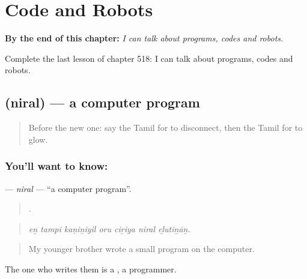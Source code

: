 
\chapter{Code and Robots}
\label{ch:ta-code-and-robots}

\begin{chapteropening}
\textbf{By the end of this chapter:} \emph{I can talk about programs, codes and robots.}

Complete the last lesson of chapter 518: I can talk about programs, codes and robots.
\end{chapteropening}

\section[\texorpdfstring{\ta{நிரல்} (niral)}{நிரல் (niral)}]{ (niral) — a computer program}

\label{lesson:TA-C518-niral}



\begin{quote}
Before the new one: say the Tamil for to disconnect, then the Tamil for to glow.
\end{quote}

\subsection*{You'll want to know: }
\textbf{} — \emph{niral} — \textquotedblleft{}a computer program\textquotedblright{}.

\begin{quote}
      .
\end{quote}

\begin{quote}
\emph{eṉ tampi kaṇiṉiyil oru ciṟiya niral eḻutiṉāṉ.}
\end{quote}

\begin{quote}
My younger brother wrote a small program on the computer.
\end{quote}

The one who writes them is a , a programmer.

